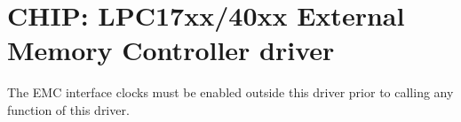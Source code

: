 \hypertarget{group__EMC__17XX__40XX}{\section{C\-H\-I\-P\-: L\-P\-C17xx/40xx External Memory Controller driver}
\label{group__EMC__17XX__40XX}
}
The E\-M\-C interface clocks must be enabled outside this driver prior to calling any function of this driver. 